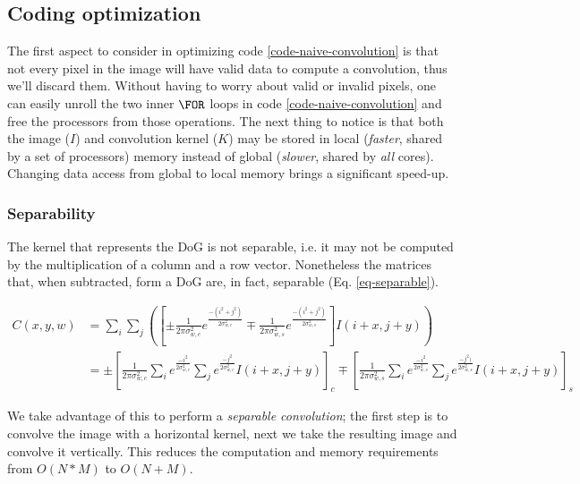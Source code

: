 \subsection{Coding optimization}
The first aspect to consider in optimizing code 
\ref{code-naive-convolution} is that not every pixel in the 
image will have valid data to compute a convolution, thus we'll 
discard them. Without having to worry about valid or invalid 
pixels, one can easily unroll the two inner $\FOR$ loops in 
code \ref{code-naive-convolution} and
free the processors from those operations. The next thing to notice
is that both the image ($I$) and convolution kernel ($K$) may
be stored in local (\emph{faster}, shared by a set of processors) 
memory instead of global (\emph{slower}, shared by \emph{all} 
cores). Changing data access from global to local memory brings
a significant speed-up.

\subsubsection{Separability}
The kernel that represents the DoG is not separable, i.e. 
it may not be computed by the multiplication of a column and
a row vector. Nonetheless the matrices that, when subtracted, 
form a DoG are, in fact, separable (Eq. \ref{eq-separable}). 

\begin{align}
C(x,y,w) &= \sum_i \sum_j \left( \left[
              \pm\frac{1}{2\pi\sigma_{w,c}^2}
                  e^{\frac{-(i^2 + j^2)}{2\sigma_{w,c}^2}}
              \mp\frac{1}{2\pi\sigma_{w,s}^2}
                  e^{\frac{-(i^2 + j^2)}{2\sigma_{w,s}^2}} \right]
              I(i+x, j+y) 
            \right) \\
         &= \pm\left[\frac{1}{2\pi\sigma_{w,c}^2} 
                     \sum_i e^{\frac{-i^2}{2\sigma_{w,c}^2}} 
                     \sum_j e^{\frac{-j^2}{2\sigma_{w,c}^2}}
                     I(i+x, j+y)
                \right]_{c} %
             \mp \left[ \frac{1}{2\pi\sigma_{w,s}^2}
                        \sum_i e^{\frac{-i^2}{2\sigma_{w,s}^2}}
                        \sum_j e^{\frac{-j^2)}{2\sigma_{w,s}^2}}
                        I(i+x, j+y) 
               \right]_{s}
\label{eq-separable}
\end{align}

We take advantage of this to perform a \emph{separable convolution}; 
the first step is to convolve the image with a horizontal kernel, 
next we take the resulting image and convolve it vertically. This 
reduces the computation and memory requirements from $O(N*M)$ to $O(N+M)$.

